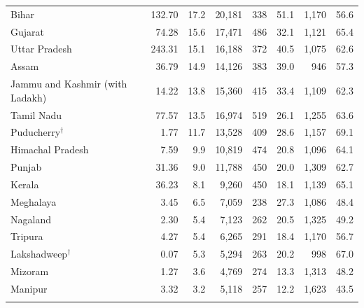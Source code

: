 \begin{tabular}{@{}>{\raggedright\arraybackslash}p{2.95cm} r r r r r r r@{}}
Bihar & 132.70 & 17.2 & 20{,}181 & 338 & 51.1 & 1{,}170 & 56.6 \\
Gujarat & 74.28 & 15.6 & 17{,}471 & 486 & 32.1 & 1{,}121 & 65.4 \\
Uttar Pradesh & 243.31 & 15.1 & 16{,}188 & 372 & 40.5 & 1{,}075 & 62.6 \\
Assam & 36.79 & 14.9 & 14{,}126 & 383 & 39.0 & 946 & 57.3 \\
Jammu and Kashmir (with Ladakh) & 14.22 & 13.8 & 15{,}360 & 415 & 33.4 & 1{,}109 & 62.3 \\
Tamil Nadu & 77.57 & 13.5 & 16{,}974 & 519 & 26.1 & 1{,}255 & 63.6 \\
Puducherry$^\dagger$ & 1.77 & 11.7 & 13{,}528 & 409 & 28.6 & 1{,}157 & 69.1 \\
Himachal Pradesh & 7.59 & 9.9 & 10{,}819 & 474 & 20.8 & 1{,}096 & 64.1 \\
Punjab & 31.36 & 9.0 & 11{,}788 & 450 & 20.0 & 1{,}309 & 62.7 \\
Kerala & 36.23 & 8.1 & 9{,}260 & 450 & 18.1 & 1{,}139 & 65.1 \\
Meghalaya & 3.45 & 6.5 & 7{,}059 & 238 & 27.3 & 1{,}086 & 48.4 \\
Nagaland & 2.30 & 5.4 & 7{,}123 & 262 & 20.5 & 1{,}325 & 49.2 \\
Tripura & 4.27 & 5.4 & 6{,}265 & 291 & 18.4 & 1{,}170 & 56.7 \\
Lakshadweep$^\dagger$ & 0.07 & 5.3 & 5{,}294 & 263 & 20.2 & 998 & 67.0 \\
Mizoram & 1.27 & 3.6 & 4{,}769 & 274 & 13.3 & 1{,}313 & 48.2 \\
Manipur & 3.32 & 3.2 & 5{,}118 & 257 & 12.2 & 1{,}623 & 43.5 \\
\bottomrule
\multicolumn{8}{@{}l}{\footnotesize $^\dagger$ Union territory outside the main sample.}\\
\end{tabular}
